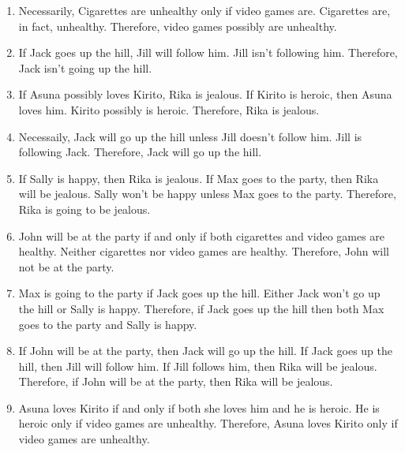 \begin{enumerate}
\item Necessarily, Cigarettes are unhealthy only if video games are. Cigarettes are, in fact, unhealthy. Therefore, video games possibly are unhealthy.
\item If Jack goes up the hill, Jill will follow him. Jill isn't following him. Therefore, Jack isn't going up the hill.
\item If Asuna possibly loves Kirito, Rika is jealous. If Kirito is heroic, then Asuna loves him. Kirito possibly is heroic. Therefore, Rika is jealous. 
\item Necessaily, Jack will go up the hill unless Jill doesn't follow him. Jill is following Jack. Therefore, Jack will go up the hill.
\item If Sally is happy, then Rika is jealous. If Max goes to the party, then Rika will be jealous. Sally won't be happy unless Max goes to the party. Therefore, Rika is going to be jealous.
\item John will be at the party if and only if both cigarettes and video games are healthy. Neither cigarettes nor video games are healthy. Therefore, John will not be at the party. 
\item Max is going to the party if Jack goes up the hill. Either Jack won't go up the hill or Sally is happy. Therefore, if Jack goes up the hill then both Max goes to the party and Sally is happy.
\item If John will be at the party, then Jack will go up the hill. If Jack goes up the hill, then Jill will follow him. If Jill follows him, then Rika will be jealous. Therefore, if John will be at the party, then Rika will be jealous. 
\item Asuna loves Kirito if and only if both she loves him and he is heroic. He is heroic only if video games are unhealthy. Therefore, Asuna loves Kirito only if video games are unhealthy. 
\end{enumerate}

